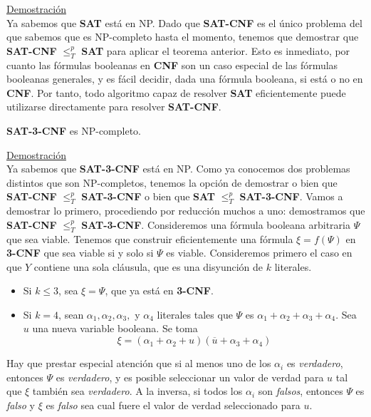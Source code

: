 \underline{Demostración}\\

Ya sabemos que \textbf{SAT} está en NP. Dado que \textbf{SAT-CNF} es el único problema del que sabemos que es NP-completo hasta el momento, tenemos que demostrar que \textbf{SAT-CNF} $\leq _{T}^p$ \textbf{SAT} para aplicar el teorema anterior. Esto es inmediato, por cuanto las fórmulas booleanas en \textbf{CNF} son un caso especial de las fórmulas booleanas generales, y es fácil decidir, dada una fórmula booleana, si está o no en \textbf{CNF}. Por tanto, todo algoritmo capaz de resolver \textbf{SAT} eficientemente puede utilizarse directamente para resolver \textbf{SAT-CNF}.\\

\begin{fondo}
\textbf{SAT-3-CNF} es NP-completo.
\end{fondo}

\underline{Demostración}\\

Ya sabemos que \textbf{SAT-3-CNF} está en NP. Como ya conocemos dos problemas distintos que son NP-completos, tenemos la opción de demostrar o bien que \textbf{SAT-CNF} $\leq _{T}^p$ \textbf{SAT-3-CNF} o bien que \textbf{SAT} $\leq _{T}^p$ \textbf{SAT-3-CNF}. Vamos a demostrar lo primero, procediendo por reducción muchos a uno: demostramos que \textbf{SAT-CNF} $\leq _{T}^p$ \textbf{SAT-3-CNF}. Consideremos una fórmula booleana arbitraria $\Psi$ que sea viable. Tenemos que construir eficientemente una fórmula $\xi = f(\Psi)$ en \textbf{3-CNF} que sea viable si y solo si $\Psi$ es viable. Consideremos primero el caso en que $Y$ contiene una sola cláusula, que es una disyunción de $k$ literales.\\

\begin{itemize} 
\item Si $k \leq 3$, sea $\xi = \Psi$, que ya está en \textbf{3-CNF}.
\item Si $k = 4$, sean $\alpha_1, \alpha_2, \alpha_3,$ y $\alpha_4$ literales tales que $\Psi$ es $\alpha_1 + \alpha_2 + \alpha_3 + \alpha_4$. Sea $u$ una nueva variable booleana. Se toma
\[ \xi = (\alpha_1 + \alpha_2 + u)(\overline{u} + \alpha_3 + \alpha_4) \]
\end{itemize}

Hay que prestar especial atención que si al menos uno de los $\alpha_i$ es \emph{verdadero}, entonces $\Psi$ es \emph{verdadero}, y es posible seleccionar un valor de verdad para $u$ tal que $\xi$ también sea \emph{verdadero}. A la inversa, si todos los $\alpha_i$ son \emph{falsos}, entonces $\Psi$ es \emph{falso} y $\xi$ es \emph{falso} sea cual fuere el valor de verdad seleccionado para $u$.

